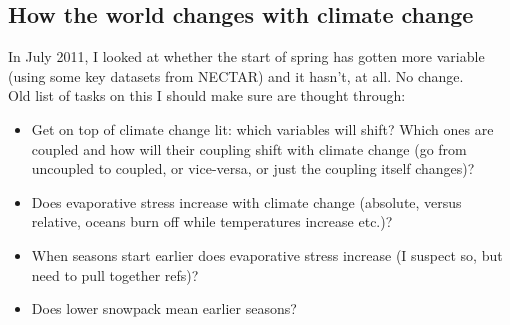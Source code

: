 \documentclass[11pt,a4paper,oneside]{article}
\begin{document}
\subsection{How the world changes with climate change}

\noindent In July 2011, I looked at whether the start of spring
has gotten more variable (using some key datasets from NECTAR) and it
hasn't, at all. No change.\\

\noindent Old list of tasks on this I should make sure are thought through:
\begin{itemize}
\item Get on top of climate change lit: which variables will shift?
  Which ones are coupled and how will their coupling shift with
  climate change (go from uncoupled to coupled, or vice-versa, or just
  the coupling itself changes)?
\item Does evaporative stress increase with climate change (absolute,
  versus relative, oceans burn off while temperatures increase etc.)?
\item When seasons start earlier does evaporative stress increase (I
  suspect so, but need to pull together refs)?
\item Does lower snowpack mean earlier seasons?
\end{itemize}
\end{document}
